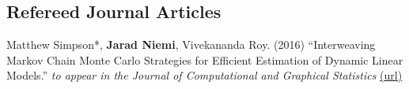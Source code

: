 \documentclass[overlapped,line]{res}
\begin{document}
\begin{resume}
% 
% 
% 
% 
% 
% 
% 
% 
% 
% 
% 
% 
% 

\subsection{\bf Refereed Journal Articles}

\vspace{-0.2in}

Matthew Simpson*, {\bf Jarad Niemi}, Vivekananda Roy. (2016) ``Interweaving Markov Chain Monte Carlo Strategies for Efficient Estimation of Dynamic Linear Models.'' \emph{to appear in the Journal of Computational and Graphical Statistics} \href{http://www.tandfonline.com/doi/abs/10.1080/10618600.2015.1105748}{(url)}


\end{resume}
\end{document}
